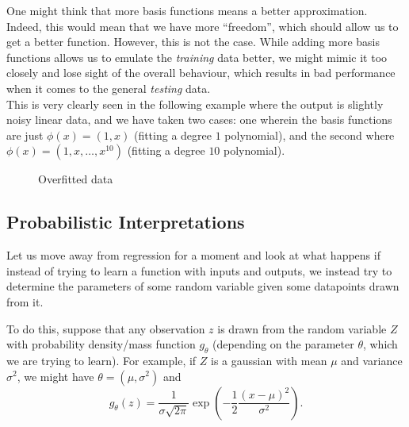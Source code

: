 \documentclass{article}
\begin{document}
		\begin{remark}[Overfitting]
			One might think that more basis functions means a better approximation. Indeed, this would mean that we have more ``freedom'', which should allow us to get a better function. However, this is not the case. While adding more basis functions allows us to emulate the \emph{training} data better, we might mimic it too closely and lose sight of the overall behaviour, which results in bad performance when it comes to the general \emph{testing} data.\\
			This is very clearly seen in the following example where the output is slightly noisy linear data, and we have taken two cases: one wherein the basis functions are just $\phi(x) = (1,x)$ (fitting a degree $1$ polynomial), and the second where $\phi(x) = (1,x,\ldots,x^{10})$ (fitting a degree $10$ polynomial).

			\begin{figure}[H]
				\centering
				\caption{Overfitted data}
			\end{figure}
		\end{remark}

	\subsection{Probabilistic Interpretations}

		Let us move away from regression for a moment and look at what happens if instead of trying to learn a function with inputs and outputs, we instead try to determine the parameters of some random variable given some datapoints drawn from it.

		To do this, suppose that any observation $z$ is drawn from the random variable $Z$ with probability density/mass function $g_\theta$ (depending on the parameter $\theta$, which we are trying to learn). For example, if $Z$ is a gaussian with mean $\mu$ and variance $\sigma^2$, we might have $\theta = (\mu,\sigma^2)$ and
		\[ g_\theta(z) = \frac{1}{\sigma\sqrt{2\pi}} \exp\left( -\frac{1}{2} \frac{(x-\mu)^2}{\sigma^2} \right). \]
	
\end{document}
